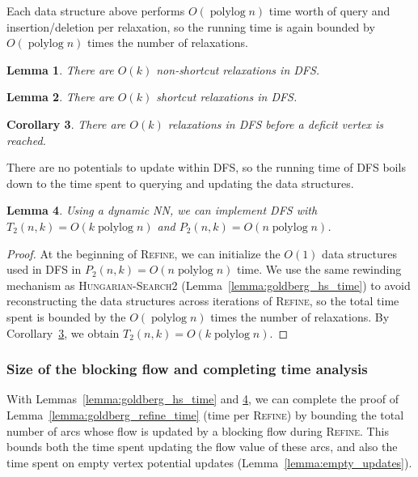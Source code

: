 \documentclass[11pt]{article}
\def\polylog{\mathop{\mathrm{polylog}}}
\theoremstyle{plain}
\newtheorem{lemma}{Lemma}[section]
\newtheorem{corollary}[lemma]{Corollary}
\numberwithin{figure}{section}
\begin{document}
Each data structure above performs $O(\polylog n)$ time worth of query and
insertion/deletion per relaxation, so the running time is again bounded by
$O(\polylog n)$ times the number of relaxations.

\begin{lemma}
\label{lemma:goldberg_dfs_length1}
There are $O(k)$ non-shortcut relaxations in \textsc{DFS}.
\end{lemma}

\begin{lemma}
\label{lemma:goldberg_dfs_length2}
There are $O(k)$ shortcut relaxations in \textsc{DFS}.
\end{lemma}

\begin{corollary}
\label{corollary:goldberg_dfs_length}
There are $O(k)$ relaxations in \textsc{DFS} before a deficit vertex is
reached.
\end{corollary}

There are no potentials to update within \textsc{DFS}, so the running time of
\textsc{DFS} boils down to the time spent to querying and updating the data
structures.

\begin{lemma}
\label{lemma:goldberg_dfs_time}
Using a dynamic NN, we can implement \textsc{DFS} with
$T_2(n, k) = O(k\polylog n)$ and $P_2(n, k) = O(n\polylog n)$.
\end{lemma}

\begin{proof}
At the beginning of \textsc{Refine}, we can initialize the $O(1)$ data
structures used in \textsc{DFS} in $P_2(n, k) = O(n\polylog n)$ time.
We use the same rewinding mechanism as \textsc{Hungarian-Search2}
(Lemma~\ref{lemma:goldberg_hs_time}) to avoid reconstructing the data
structures across iterations of \textsc{Refine}, so the total time spent
is bounded by the $O(\polylog n)$ times the number of relaxations.
By Corollary~\ref{corollary:goldberg_dfs_length}, we obtain
$T_2(n, k) = O(k\polylog n)$.
\end{proof}

\subsubsection{Size of the blocking flow and completing time analysis}

With Lemmas~\ref{lemma:goldberg_hs_time} and \ref{lemma:goldberg_dfs_time},
we can complete the proof of Lemma~\ref{lemma:goldberg_refine_time}
(time per \textsc{Refine}) by bounding the total number of arcs whose flow is
updated by a blocking flow during \textsc{Refine}.
This bounds both the time spent updating the flow value of these arcs, and
also the time spent on empty vertex potential updates
(Lemma~\ref{lemma:empty_updates}).
\end{document}
